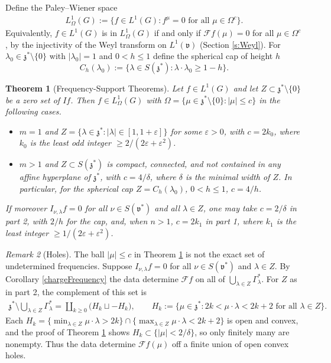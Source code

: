 \documentclass[11pt]{amsart}
\theoremstyle{plain}
\newtheorem{theorem}{Theorem}[section]
\theoremstyle{definition}
\theoremstyle{remark}
\newtheorem{remark}[theorem]{Remark}
\numberwithin{equation}{section}
\def\fz{\mathfrak{z}}
\def\fv{\mathfrak{v}}
\def\cF{\mathcal{F}}
\def\mz{\setminus\{0\}}
\def\eps{\varepsilon}
\numberwithin{equation}{section}
\begin{document}
Define the Paley--Wiener space
\begin{align*}
	L^1_{\Omega}(G):=\{f\in L^1(G): f^\mu=0 \text{ for all } \mu\in \Omega^c\}.
\end{align*}
Equivalently, $f\in L^1(G)$ is in $L^1_\Omega(G)$ if and only if $\cF f(\mu)=0$ for all $\mu\in \Omega^c$, by the injectivity of the Weyl transform on $L^1(\fv)$ (Section \ref{s:Weyl}).
For $\lambda_0\in \fz^*\mz$ with $|\lambda_0|=1$ and $0<h\leq 1$ define the spherical cap of height $h$
$$C_h(\lambda_0):=\{\lambda\in S(\fz^*): \lambda\cdot\lambda_0\geq 1-h \}.$$
\begin{theorem}[Frequency-Support Theorems]\label{PW2}
	Let $f\in L^1(G)$ and let $Z\subset \fz^*\mz$ be a zero set of $If$. Then $f\in L^1_\Omega(G)$ with $\Omega=\{\mu\in \fz^*\mz: |\mu|\leq c\}$ in the following cases.
	\begin{itemize}
		\item[1.] $m=1$ and $Z=\{\lambda\in \fz^*: |\lambda|\in [1, 1+\eps]\}$ for some $\eps>0$, with $c=2k_0$, where $k_0$ is the least odd integer $\geq 2/(2\eps+\eps^2)$.
		\item[2.] $m>1$ and $Z\subset S(\fz^*)$ is compact, connected, and not contained in any affine hyperplane of $\fz^*$, with $c=4/\delta$, where $\delta$ is the minimal width of $Z$. In particular, for the spherical cap $Z=C_h(\lambda_0)$, $0<h\leq 1$, $c=4/h$.
	\end{itemize}
	If moreover $I_{\nu, \lambda}f=0$ for all $\nu\in S(\fv^*)$ and all $\lambda\in Z$, one may take $c=2/\delta$ in part 2, with $2/h$ for the cap, and, when $n>1$, $c=2k_1$ in part 1, where $k_1$ is the least integer $\geq 1/(2\eps+\eps^2)$.
\end{theorem}
\begin{remark}[Holes]\label{r:holes}
	The ball $|\mu|\leq c$ in Theorem \ref{PW2} is not the exact set of undetermined frequencies. Suppose $I_{\nu, \lambda}f=0$ for all $\nu\in S(\fv^*)$ and $\lambda\in Z$. By Corollary \ref{chargeFrequency} the data determine $\cF f$ on all of $\bigcup_{\lambda\in Z}\Gamma_\lambda^*$. For $Z$ as in part 2, the complement of this set is
	\begin{align*}
		\fz^*\setminus\bigcup_{\lambda\in Z}\Gamma_\lambda^*=\coprod_{k\geq 0}\big(H_k\sqcup -H_k\big), \qquad H_k:=\{\mu\in \fz^*: 2k<\mu\cdot\lambda<2k+2 \text{ for all } \lambda\in Z\}.
	\end{align*}
	 Each $H_k=\{\min_{\lambda\in Z}\mu\cdot\lambda>2k\}\cap\{\max_{\lambda\in Z}\mu\cdot\lambda<2k+2\}$ is open and convex, and the proof of Theorem \ref{PW2} shows $H_k\subset\{|\mu|<2/\delta\}$, so only finitely many are nonempty. Thus the data determine $\cF f(\mu)$ off a finite union of open convex holes.
\end{remark}
\end{document}

